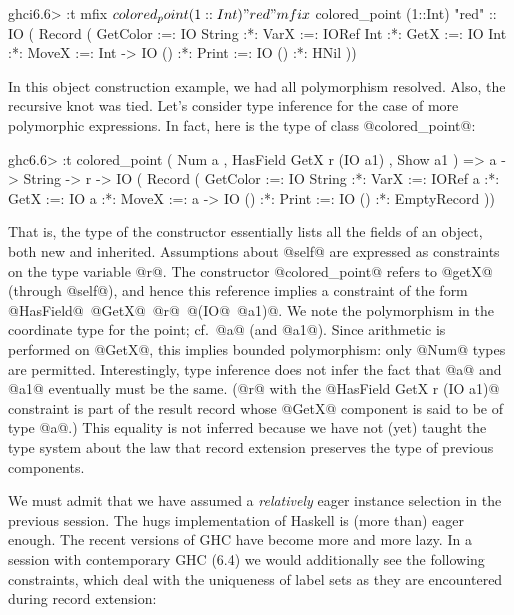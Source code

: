 \begin{code}
 ghci6.6> :t mfix $ colored_point (1::Int) "red"
 mfix $ colored_point (1::Int) "red" ::
        IO ( Record (
               GetColor :=: IO String
           :*: VarX     :=: IORef Int
           :*: GetX     :=: IO Int
           :*: MoveX    :=: Int -> IO ()
           :*: Print    :=: IO ()
           :*: HNil ))
\end{code} 

In this object construction example, we had all polymorphism
resolved. Also, the recursive knot was tied. Let's consider type
inference for the case of more polymorphic expressions. In
fact, here is the type of class @colored_point@:

\begin{code}
 ghc6.6> :t colored_point
 ( Num a
 , HasField GetX r (IO a1)
 , Show a1
 ) => a
   -> String
   -> r
   -> IO ( Record (
             GetColor :=: IO String
         :*: VarX     :=: IORef a
         :*: GetX     :=: IO a
         :*: MoveX    :=: a -> IO ()
         :*: Print    :=: IO ()
         :*: EmptyRecord ))
\end{code}

That is, the type of the constructor essentially lists all the fields
of an object, both new and inherited. Assumptions about @self@ are
expressed as constraints on the type variable @r@. The constructor
@colored_point@ refers to @getX@ (through @self@), and hence this
reference implies a constraint of the form
@HasField@~@GetX@~@r@~@(IO@~@a1)@. We note the polymorphism in the
coordinate type for the point; cf.\ @a@ (and @a1@). Since arithmetic
is performed on @GetX@, this implies bounded polymorphism: only @Num@
types are permitted. Interestingly, type inference does not infer the
fact that @a@ and @a1@ eventually must be the same. (@r@ with the
@HasField GetX r (IO a1)@ constraint is part of the result record
whose @GetX@ component is said to be of type @a@.)  This equality is
not inferred because we have not (yet) taught the type system about
the law that record extension preserves the type of previous
components.

We must admit that we have assumed a \emph{relatively} eager instance
selection in the previous session. The hugs implementation of Haskell
is (more than) eager enough. The recent versions of GHC have become
more and more lazy. In a session with contemporary GHC (6.4) we would
additionally see the following constraints, which deal with the
uniqueness of label sets as they are encountered during record
extension:

